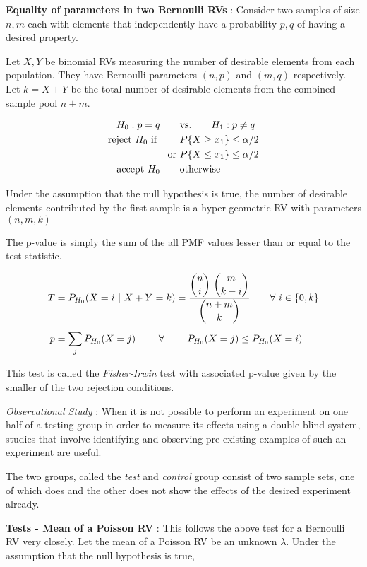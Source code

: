 \textbf{Equality of parameters in two Bernoulli RVs} : Consider two samples of size $ n, m $ each with elements that independently have a probability $ p, q $ of having a desired property.

Let $ X, Y $ be binomial RVs measuring the number of desirable elements from each population. They have Bernoulli parameters $ (n,p) $ and $ (m, q) $ respectively. Let $ k = X + Y $ be the total number of desirable elements from the combined sample pool $ n+m $.

\begin{align}
	H_0 : p  = q \qquad &\text{vs.} \qquad H_1 : p  \neq q \nonumber \\
	\text{reject $ H_0 $ if } \qquad & P\{X \geq x_1\} \leq \alpha/2  \nonumber \\
	\text{or }& P\{X \leq x_1\} \leq \alpha/2 \nonumber \\
	\text{accept $ H_0 $} \qquad & \text{otherwise}
\end{align}

Under the assumption that the null hypothesis is true, the number of desirable elements contributed by the first sample is a hyper-geometric RV with parameters $ (n, m, k) $

The p-value is simply the sum of the all PMF values lesser than or equal to the test statistic.

\begin{align}
	T &= P_{H_0}(X = i\ |\ X+Y = k) = \frac{\displaystyle \binom{n}{i}\ \binom{m}{k-i}}{\displaystyle \binom{n+m}{k}} \qquad \forall \ i \in \{0, k\} \nonumber \\[1ex]
	p &= \sum\limits_{j} P_{H_0}(X = j)\  \qquad \forall \qquad \ P_{H_0}(X = j)\leq P_{H_0}(X = i)
\end{align}

This test is called the \textit{Fisher-Irwin} test with associated p-value given by the smaller of the two rejection conditions.

\textit{Observational Study} : When it is not possible to perform an experiment on one half of a testing group in order to measure its effects using a double-blind system, studies that involve identifying and observing pre-existing examples of such an experiment are useful.

The two groups, called the \textit{test} and \textit{control} group consist of two sample sets, one of which does and the other does not show the effects of the desired experiment already.

\textbf{Tests - Mean of a Poisson RV} : This follows the above test for a Bernoulli RV very closely. Let the mean of a Poisson RV be an unknown $ \lambda $. Under the assumption that the null hypothesis is true,


